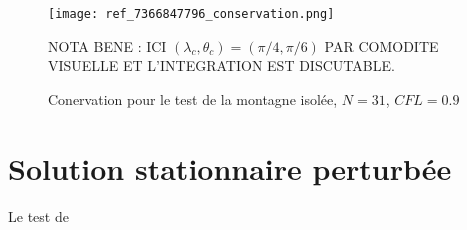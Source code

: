 \begin{figure}
\begin{center}
\texttt{[image: ref\_7366847796\_conservation.png]}\\
\end{center}
\caption{Conervation pour le test de la montagne isolée, $N=31$, $CFL=0.9$}
\begin{com}
NOTA BENE : ICI $(\lambda_c, \theta_c)=(\pi/4, \pi/6)$ PAR COMODITE VISUELLE ET L'INTEGRATION EST DISCUTABLE.
\end{com}
\label{Williamson 5 - conservation}
\end{figure}

\section{Solution stationnaire perturbée}

Le test de \cite{Galewsky2004}